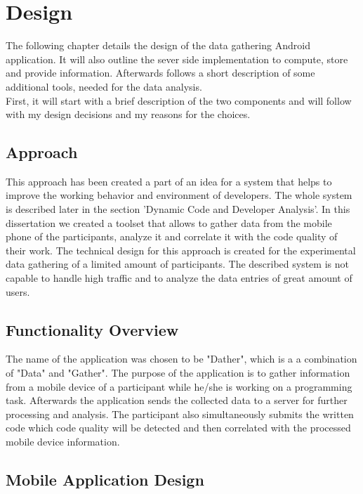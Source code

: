 \chapter{Design}

The following chapter details the design of the data gathering Android application. It will also outline the sever side implementation to compute, store and provide information. Afterwards follows a short description of some additional tools, needed for the data analysis.\\
First, it will start with a brief description of the two components and will follow with my design decisions and my reasons for the choices. 

\section{Approach}
This approach has been created a part of an idea for a system that helps to improve the working behavior and environment of developers. The whole system is described later in the section 'Dynamic Code and Developer Analysis'.
In this dissertation we created a toolset that allows to gather data from the mobile phone of the participants, analyze it and correlate it with the code quality of their work. The technical design for this approach is created for the experimental data gathering of a limited amount of participants. The described system is not capable to handle high traffic and to analyze the data entries of great amount of users. 

\section{Functionality Overview}
The name of the application was chosen to be "Dather", which is a a combination of "Data" and "Gather".
The purpose of the application is to gather information from a mobile device of a participant while he/she is working on a programming task. Afterwards the application sends the collected data to a server for further processing and analysis. The participant also simultaneously submits the written code which code quality will be detected and then correlated with the processed mobile device information. 

\section{Mobile Application Design}

